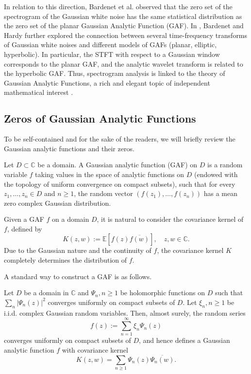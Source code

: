 In relation to this direction, Bardenet et al. \cite{BARDENET_Spec} observed that the zero set of the spectrogram of the Gaussian white noise has the same statistical distribution as the zero set of the planar Gaussian Analytic Function (GAF). In \cite{BARDENET_GAF}, Bardenet and Hardy further explored the connection between several time-frequency transforms of Gaussian white noises and different models of GAFs (planar, elliptic, hyperbolic). In particular, the STFT with respect to a Gaussian window corresponds to the planar GAF, and the analytic wavelet transform \cite{Daubechies_1988} is related to the hyperbolic GAF. Thus, spectrogram analysis is linked to the theory of Gaussian Analytic Functions, a rich and elegant topic of independent mathematical interest \cite{hough2009zeros, PeresVirag, sodin}. 

\subsection{Zeros of Gaussian Analytic Functions}
To be self-contained and for the sake of the readers, we will briefly review the Gaussian analytic functions and their zeros.
\begin{definition}
    Let $D \subset \mathbb C$ be a domain. A Gaussian analytic function (GAF) on $D$ is a random variable $f$ taking values in the space of analytic functions on $D$ (endowed with the topology of uniform convergence on compact subsets), such that for every $z_1,\ldots,z_n \in D$ and  $n \ge 1$, the random vector $(f(z_1),\ldots,f(z_n))$ has a mean zero complex Gaussian distribution.
\end{definition}

Given a GAF $f$ on a domain $D$, it is natural to consider the covariance kernel of $f$, defined by
\[ K(z,w) := \mathbb E[f(z) \overline{f(w)}], \quad z,w \in \mathbb C.\]
Due to the Gaussian nature and the continuity of $f$, the covariance kernel $K$ completely determines the distribution of $f$.

A standard way to construct a GAF is as follows.

\begin{proposition}
    Let $D$ be a domain in $\mathbb C$ and $\Psi_n, n \ge 1$ be holomorphic functions on $D$ such that $\sum_{n} |\Psi_n(z)|^2$ converges uniformly on compact subsets of $D$. Let $\xi_n, n \ge 1$ be i.i.d. complex Gaussian random variables. Then, almost surely, the random series
    \[ f(z) := \sum_{n=1}^\infty \xi_n \Psi_n(z)\]
    converges uniformly on compact subsets of $D$, and hence defines a Gaussian analytic function $f$ with covariance kernel
    \[ K(z,w) = \sum_{n\ge 1} \Psi_n(z) \overline{\Psi_n(w)}.\]
\end{proposition}

